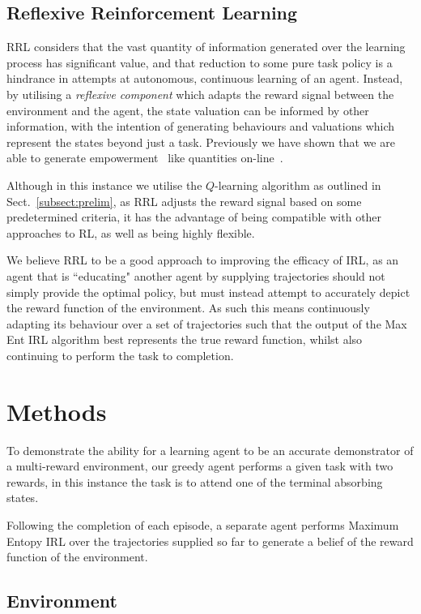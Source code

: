 \documentclass[10pt,technote]{IEEEtran}
\begin{document}
\subsection{Reflexive Reinforcement Learning}

RRL considers that the vast quantity of information generated over the learning process has significant value, and that reduction to some pure task policy is a hindrance in attempts at autonomous, continuous learning of an agent. Instead, by utilising a \emph{reflexive component} which adapts the reward signal between the environment and the agent, the state valuation can be informed by other information, with the intention of generating behaviours and valuations which represent the states beyond just a task. Previously we have shown that we are able to generate empowerment~\cite{klyubin} like quantities on-line~\cite{ncta20}.

Although in this instance we utilise the $Q$-learning algorithm as outlined in Sect.~\ref{subsect:prelim}, as RRL adjusts the reward signal based on some predetermined criteria, it has the advantage of being compatible with other approaches to RL, as well as being highly flexible.

We believe RRL to be a good approach to improving the efficacy of IRL, as an agent that is ``educating" another agent by supplying trajectories should not simply provide the optimal policy, but must instead attempt to accurately depict the reward function of the environment. As such this means continuously adapting its behaviour over a set of trajectories such that the output of the Max Ent IRL algorithm best represents the true reward function, whilst also continuing to perform the task to completion.

\section{Methods} \label{sect:methods}

To demonstrate the ability for a learning agent to be an accurate demonstrator of a multi-reward environment, our greedy agent performs a given task with two rewards, in this instance the task is to attend one of the terminal absorbing states.

Following the completion of each episode, a separate agent performs Maximum Entopy IRL over the trajectories supplied so far to generate a belief of the reward function of the environment.

\subsection{Environment}
\end{document}
